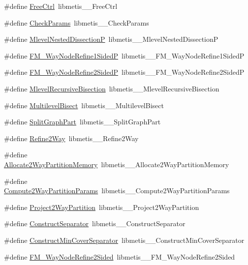 \begin{DoxyCompactItemize}
\#define \hyperlink{a00957_a46f0232a0e23012cbb95e016d80ebbdb}{Free\+Ctrl}~libmetis\+\_\+\+\_\+\+Free\+Ctrl
\item 
\#define \hyperlink{a00957_a95361cbe00e341e45a11aa89feda3aec}{Check\+Params}~libmetis\+\_\+\+\_\+\+Check\+Params
\item 
\#define \hyperlink{a00957_a7d0a93457d3641490d5935bcfe9705c3}{Mlevel\+Nested\+DissectionP}~libmetis\+\_\+\+\_\+\+Mlevel\+Nested\+DissectionP
\item 
\#define \hyperlink{a00957_a41e48083d3b1d4767bf2f190bde9645d}{F\+M\+\_\+Way\+Node\+Refine1\+SidedP}~libmetis\+\_\+\+\_\+\+F\+M\+\_\+Way\+Node\+Refine1\+SidedP
\item 
\#define \hyperlink{a00957_a256ad1715a1edcce9291711463ea6a22}{F\+M\+\_\+Way\+Node\+Refine2\+SidedP}~libmetis\+\_\+\+\_\+\+F\+M\+\_\+Way\+Node\+Refine2\+SidedP
\item 
\#define \hyperlink{a00957_a975a1c56a6ffdf5ad9116b64dbe4a05a}{Mlevel\+Recursive\+Bisection}~libmetis\+\_\+\+\_\+\+Mlevel\+Recursive\+Bisection
\item 
\#define \hyperlink{a00957_afb7423cefb41a596d4959a02ef5a5090}{Multilevel\+Bisect}~libmetis\+\_\+\+\_\+\+Multilevel\+Bisect
\item 
\#define \hyperlink{a00957_a1798dc8d3a07b6790f21f9a40e31e12b}{Split\+Graph\+Part}~libmetis\+\_\+\+\_\+\+Split\+Graph\+Part
\item 
\#define \hyperlink{a00957_aaef30988871216d35ce2660b239c9e88}{Refine2\+Way}~libmetis\+\_\+\+\_\+\+Refine2\+Way
\item 
\#define \hyperlink{a00957_a337847e857a94fcb6339e2a70e3d1e48}{Allocate2\+Way\+Partition\+Memory}~libmetis\+\_\+\+\_\+\+Allocate2\+Way\+Partition\+Memory
\item 
\#define \hyperlink{a00957_a9c17c9fd908a79fd1c096a19ac6c6952}{Compute2\+Way\+Partition\+Params}~libmetis\+\_\+\+\_\+\+Compute2\+Way\+Partition\+Params
\item 
\#define \hyperlink{a00957_a8ed1621df628075860a942b606df0828}{Project2\+Way\+Partition}~libmetis\+\_\+\+\_\+\+Project2\+Way\+Partition
\item 
\#define \hyperlink{a00957_a34cb34065f7cbb29eb3d99163cb70b19}{Construct\+Separator}~libmetis\+\_\+\+\_\+\+Construct\+Separator
\item 
\#define \hyperlink{a00957_ab3e8b08a0e3ecf203963390c80c822c9}{Construct\+Min\+Cover\+Separator}~libmetis\+\_\+\+\_\+\+Construct\+Min\+Cover\+Separator
\item 
\#define \hyperlink{a00957_a629a1c9dc9c0c51d55014d83a49f2a29}{F\+M\+\_\+Way\+Node\+Refine2\+Sided}~libmetis\+\_\+\+\_\+\+F\+M\+\_\+Way\+Node\+Refine2\+Sided

\end{DoxyCompactItemize}
